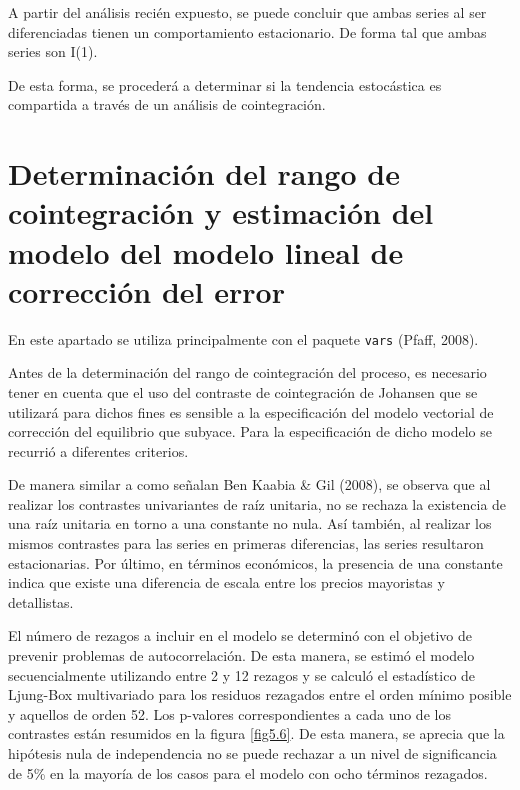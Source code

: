 \documentclass[12pt, twoside]{book}\usepackage[]{graphicx}\usepackage[]{color}
\numberwithin{equation}{section}
\numberwithin{theorem}{section}
\numberwithin{teorema}{section}
\numberwithin{defi}{section}
\numberwithin{prop}{section}
\numberwithin{defi}{section}
\theoremstyle{plain}
\begin{document}
A partir del análisis recién expuesto, se puede concluir que ambas series al ser diferenciadas tienen un comportamiento estacionario. De forma tal que ambas series son I(1).

De esta forma, se procederá a determinar si la tendencia estocástica es compartida a través de un análisis de cointegración. 

\section{Determinación del rango de cointegración y estimación del modelo del modelo lineal de corrección del error}

En este apartado se utiliza principalmente con el paquete \texttt{vars} (Pfaff, 2008). 



Antes de la determinación del rango de cointegración del proceso, es necesario tener en cuenta que el uso del contraste de cointegración de Johansen que se utilizará para dichos fines es sensible a la especificación del modelo vectorial de corrección del equilibrio que subyace. Para la especificación de dicho modelo se recurrió a diferentes criterios. 

De manera similar a como señalan Ben Kaabia \& Gil (2008), se observa que al realizar los contrastes univariantes de raíz unitaria, no se rechaza la existencia de una raíz unitaria en torno a una constante no nula. Así también, al realizar los mismos contrastes para las series en primeras diferencias, las series resultaron estacionarias. Por último, en términos económicos, la presencia de una constante indica que existe una diferencia de escala entre los precios mayoristas y detallistas. 

El número de rezagos a incluir en el modelo se determinó con el objetivo de prevenir problemas de autocorrelación. De esta manera, se estimó el modelo secuencialmente utilizando entre 2 y  12 rezagos y se calculó el estadístico de Ljung-Box multivariado para los residuos rezagados entre el orden mínimo posible y aquellos de orden 52. Los p-valores correspondientes a cada uno de los contrastes están resumidos en la figura \ref{fig5.6}. De esta manera, se aprecia que la hipótesis nula de independencia no se puede rechazar a un nivel de significancia de 5\% en la mayoría de los casos para el modelo con ocho términos rezagados. 
\end{document}
